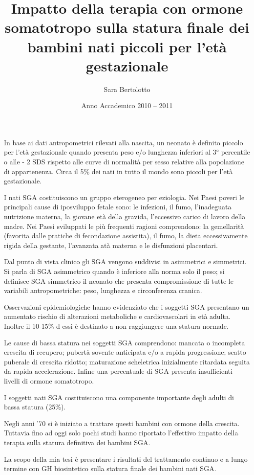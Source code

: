 \documentclass[12pt,a4paper]{article}
\author{Sara Bertolotto}
\title{Impatto della terapia con ormone somatotropo sulla statura finale dei bambini nati piccoli per l'età gestazionale}
\date{Anno Accademico 2010 -- 2011}
\begin{document}
\maketitle
In base ai dati antropometrici rilevati alla nascita, un neonato è definito piccolo per l'età gestazionale quando presenta peso e/o lunghezza inferiori al 3° percentile o alle - 2 SDS rispetto alle curve di normalità per sesso relative alla popolazione di appartenenza. Circa il 5\% dei nati in tutto il mondo sono piccoli per l'età gestazionale. 

I nati SGA costituiscono un gruppo eterogeneo per eziologia. Nei Paesi poveri le principali cause di iposviluppo fetale sono: le infezioni, il fumo, l'inadeguata nutrizione materna, la giovane età della gravida, l'eccessivo carico di lavoro della madre. Nei Paesi sviluppati le più frequenti ragioni comprendono: la gemellarità (favorita dalle pratiche di fecondazione assistita), il fumo, la dieta eccessivamente rigida della gestante, l'avanzata atà materna e le disfunzioni placentari.

Dal punto di vista clinico gli SGA vengono suddivisi in asimmetrici e simmetrici. Si parla di SGA asimmetrico quando è inferiore alla norma solo il peso; si definisce SGA simmetrico il neonato che presenta compromissione di tutte le variabili antropometriche: peso, lunghezza e circonferenza cranica.

Osservazioni epidemiologiche hanno evidenziato che i soggetti SGA presentano un aumentato rischio di alterazioni metaboliche e cardiovascolari in età adulta. Inoltre il 10-15\% d essi è destinato a non raggiungere una statura normale.

Le cause di bassa statura nei soggetti SGA comprendono: mancata o incompleta crescita di recupero; pubertà sovente anticipata e/o a rapida progressione; scatto puberale di crescita ridotto; maturazione scheletrica inizialmente ritardata seguita da rapida accelerazione. Infine una percentuale di SGA presenta insufficienti livelli di ormone somatotropo.

I soggetti nati SGA costituiscono una componente importante degli adulti di bassa statura (25\%).

Negli anni '70 si è iniziato a trattare questi bambini con ormone della crescita. Tuttavia fino ad oggi solo pochi studi hanno riportato l'effettivo impatto della terapia sulla statura definitiva dei bambini SGA.

La scopo della mia tesi è presentare i risultati del trattamento continuo e a lungo termine con GH  biosintetico sulla statura finale dei bambini nati SGA.
\end{document}
